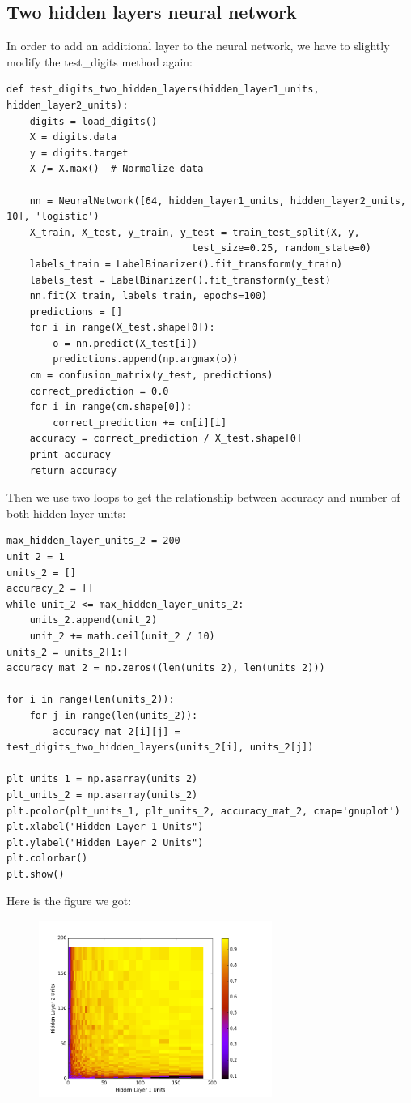 \documentclass{article}
\begin{document}
\subsection{Two hidden layers neural network}
In order to add an additional layer to the neural network, we have to slightly modify the test\_digits method again:
\begin{lstlisting}
def test_digits_two_hidden_layers(hidden_layer1_units, hidden_layer2_units):
	digits = load_digits()
	X = digits.data
	y = digits.target
	X /= X.max()  # Normalize data
	
	nn = NeuralNetwork([64, hidden_layer1_units, hidden_layer2_units, 10], 'logistic')
	X_train, X_test, y_train, y_test = train_test_split(X, y, 
								test_size=0.25, random_state=0)
	labels_train = LabelBinarizer().fit_transform(y_train)
	labels_test = LabelBinarizer().fit_transform(y_test)
	nn.fit(X_train, labels_train, epochs=100)
	predictions = []
	for i in range(X_test.shape[0]):
		o = nn.predict(X_test[i])
		predictions.append(np.argmax(o))
	cm = confusion_matrix(y_test, predictions)
	correct_prediction = 0.0
	for i in range(cm.shape[0]):
		correct_prediction += cm[i][i]
	accuracy = correct_prediction / X_test.shape[0]
	print accuracy
	return accuracy
\end{lstlisting}
Then we use two loops to get the relationship between accuracy and number of both hidden layer units:
\begin{lstlisting}
max_hidden_layer_units_2 = 200
unit_2 = 1
units_2 = []
accuracy_2 = []
while unit_2 <= max_hidden_layer_units_2:
	units_2.append(unit_2)
	unit_2 += math.ceil(unit_2 / 10)
units_2 = units_2[1:]
accuracy_mat_2 = np.zeros((len(units_2), len(units_2)))

for i in range(len(units_2)):
	for j in range(len(units_2)):
		accuracy_mat_2[i][j] = test_digits_two_hidden_layers(units_2[i], units_2[j])

plt_units_1 = np.asarray(units_2)
plt_units_2 = np.asarray(units_2)
plt.pcolor(plt_units_1, plt_units_2, accuracy_mat_2, cmap='gnuplot')
plt.xlabel("Hidden Layer 1 Units")
plt.ylabel("Hidden Layer 2 Units")
plt.colorbar()
plt.show()
\end{lstlisting}
Here is the figure we got:
 \begin{figure}[H]
 	\centering
	\includegraphics[width=3in]{figure/figure_2_2.png}
 \end{figure}
\end{document}
